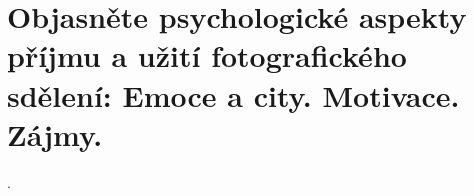 \section{Objasněte psychologické aspekty příjmu a užití fotografického sdělení: Emoce a city. Motivace. Zájmy.}.